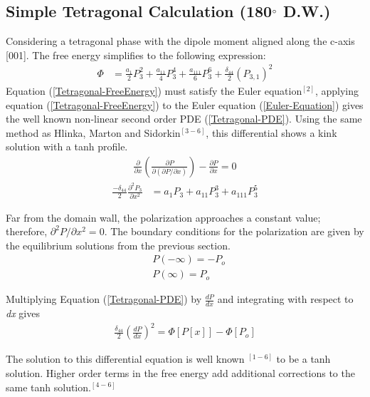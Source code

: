 \documentclass{article}
\begin{document}
\subsection{Simple Tetragonal Calculation (180$\degree$ D.W.)}

Considering a tetragonal phase with the dipole moment aligned along the c-axis [001].  The free energy simplifies to the following expression:
\begin{align}
\Phi &= \frac{a_1}{2} P_3^2+ \frac{a_{11}}{4} P_3^4 + \frac{a_{111}}{6} P_3^6+\frac{\delta_{44}}{2} (P_{3,1})^2
\label{Tetragonal-FreeEnergy}
\end{align}
Equation (\ref{Tetragonal-FreeEnergy}) must satisfy the Euler equation$^{[2]}$, applying equation (\ref{Tetragonal-FreeEnergy}) to the Euler equation (\ref{Euler-Equation}) gives the well known non-linear second order PDE (\ref{Tetragonal-PDE}).  Using the same method as Hlinka, Marton and Sidorkin$^{[3-6]}$, this differential shows a kink solution with a tanh profile.
\begin{align}
\frac{\partial}{\partial x}(\frac{\partial P}{\partial ( \partial P/ \partial x)})-\frac{\partial P}{\partial x}=0
\label{Euler-Equation}
\end{align}
\begin{align}
\frac{-\delta_{44}}{2} \frac{\partial^2 P_3}{\partial x^2} &= a_1 P_3 + a_{11} P_3^3 + a_{111} P_3^5
\label{Tetragonal-PDE}
\end{align}

Far from the domain wall, the polarization approaches a constant value; therefore, $ \partial^2 P / \partial x^2 = 0$.  The boundary conditions for the polarization  are given by the equilibrium solutions from the previous section.
\begin{align*}
& P(-\infty) = -P_o \\
& P(\infty) = P_o
\end{align*}

Multiplying Equation (\ref{Tetragonal-PDE}) by $\frac{dP}{dx}$ and integrating with respect to \emph{dx} gives
\begin{align}
\frac{\delta_{44}}{2}(\frac{dP}{dx})^2=\Phi[P[x]]-\Phi[P_o]
\end{align}

The solution to this differential equation is well known $ ^{[1-6]}$ to be a tanh solution.  Higher order terms in the free energy add additional corrections to the same tanh solution.$^{[4-6]}$
\end{document}
